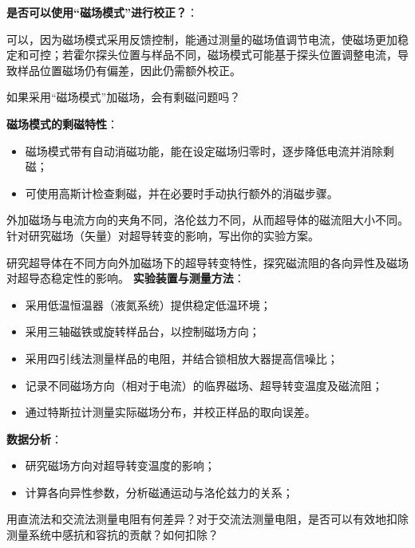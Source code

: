 \textbf{是否可以使用“磁场模式”进行校正？}：

   可以，因为磁场模式采用反馈控制，能通过测量的磁场值调节电流，使磁场更加稳定和可控；若霍尔探头位置与样品不同，磁场模式可能基于探头位置调整电流，导致样品位置磁场仍有偏差，因此仍需额外校正。




\begin{question}
    如果采用“磁场模式”加磁场，会有剩磁问题吗？
\end{question}

\textbf{磁场模式的剩磁特性}：
\begin{itemize}
    \item 磁场模式带有自动消磁功能，能在设定磁场归零时，逐步降低电流并消除剩磁；
    \item 可使用高斯计检查剩磁，并在必要时手动执行额外的消磁步骤。
\end{itemize}





\begin{question}
    外加磁场与电流方向的夹角不同，洛伦兹力不同，从而超导体的磁流阻大小不同。针对研究磁场（矢量）对超导转变的影响，写出你的实验方案。
\end{question}

研究超导体在不同方向外加磁场下的超导转变特性，探究磁流阻的各向异性及磁场对超导态稳定性的影响。
\textbf{实验装置与测量方法}：
\begin{itemize}
    \item 采用低温恒温器（液氮系统）提供稳定低温环境；
    \item 采用三轴磁铁或旋转样品台，以控制磁场方向；
    \item 采用四引线法测量样品的电阻，并结合锁相放大器提高信噪比；
    \item 记录不同磁场方向（相对于电流）的临界磁场、超导转变温度及磁流阻；
    \item 通过特斯拉计测量实际磁场分布，并校正样品的取向误差。
\end{itemize}

\textbf{数据分析}：
\begin{itemize}
    \item 研究磁场方向对超导转变温度的影响；
    \item 计算各向异性参数，分析磁通运动与洛伦兹力的关系；
\end{itemize}



\begin{question}
    用直流法和交流法测量电阻有何差异？对于交流法测量电阻，是否可以有效地扣除测量系统中感抗和容抗的贡献？如何扣除？
\end{question}

